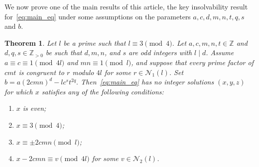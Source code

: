 \documentclass[11pt,a4paper]{amsart}
\newcommand{\ZZ}{\mathbb{Z}}
\theoremstyle{plain}
\newtheorem{theorem}{Theorem}[section]
\theoremstyle{definition}
\begin{document}
We now prove one of the main results of this article, the key insolvability result for~\eqref{eq:main_eq} under some assumptions on the parameters $a,c,d,m,n,t,q,s$ and $b$.
\begin{theorem}\label{thm:main_general_l}
Let $l$ be a prime such that $l \equiv 3 \pmod 4$. Let $a, c, m, n, t \in \ZZ$ and $d, q, s \in \ZZ_{>0}$ be such that $d, m, n$, and $s$ are odd integers with $l \mid d$. Assume $a \equiv c \equiv 1 \pmod{4l}$ and $mn \equiv 1 \pmod{l}$, and suppose that every prime factor of $cmt$ is congruent to $r$ modulo $4l$ for some $r \in \mathcal{N}_1(l)$. Set $b = a (2 c m n)^{d} - l c^{s} t^{2q}.$ Then~\eqref{eq:main_eq} has no integer solutions $(x,y,z) $ for which $x$ satisfies any of the following conditions:
\begin{enumerate}[label=(\alph*)]
    \item $x$ is even; \label{cond:1}
    \item $x \equiv 3 \pmod 4$; \label{cond:2}
    \item $x \equiv \pm 2cmn \pmod l$;\label{cond:3}
    \item $x - 2cmn \equiv v \pmod{4l}$ for some $v \in \mathcal{N}_2(l) $\label{cond:4}.
\end{enumerate}
\end{theorem}
\end{document}
